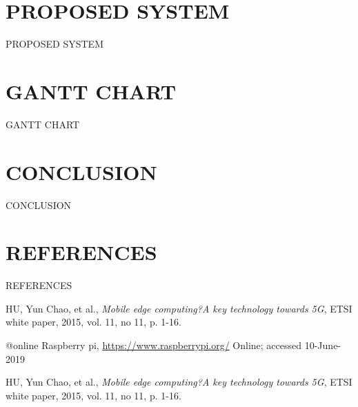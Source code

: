 \documentclass[svgnames,9pt]{beamer}
\begin{document}
\section{PROPOSED SYSTEM}
\begin{frame}{ PROPOSED SYSTEM }	
\end{frame}
\section{GANTT CHART}
\begin{frame}{GANTT CHART}
    
\end{frame}
\section{CONCLUSION}
\begin{frame}{ CONCLUSION }	
\end{frame}
\section{REFERENCES}
\begin{frame}{REFERENCES}
\begin{thebibliography}{99}
	 HU, Yun Chao, et al., \emph{Mobile edge computing?A key technology
		towards 5G}, ETSI white paper, 2015, vol. 11, no 11, p. 1-16.
	
	
	@online{ Raspberry pi,
		\url{https://www.raspberrypi.org/}
		Online; accessed 10-June-2019
	}
	
	 HU, Yun Chao, et al., \emph{Mobile edge computing?A key technology
		towards 5G}, ETSI white paper, 2015, vol. 11, no 11, p. 1-16.		
\end{thebibliography}
\end{frame}
\end{document}
